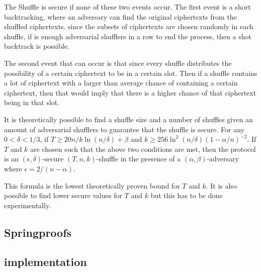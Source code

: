 The Shuffle is secure if none of these two events occur.
The first event is a short backtracking, where an adversary can find the original ciphertexts from the shuffled ciphertexts.
since the subsets of ciphertexts are chosen randomly in each shuffle, if is enough adversarial shufflers in a row to end the process, then a shot backtrack is possible.

The second event that can occur is that since every shuffle distributes the possibility of a certain ciphertext to be in a certain slot.
Then if a shuffle contains a lot of ciphertext with a larger than average chance of containing a certain ciphertext, then that would imply that there is a higher chance of that ciphertext being in that slot.

It is theoretically possible to find a shuffle size and a number of shuffles given an amount of adversarial shufflers to guarantee that the shuffle is secure.
For any $0 < \delta < 1/3$, if $T \geq 20 n / k \ln(n/\delta) + \beta $ and $ k \geq 256 \ln^2(n/\delta)(1 - \alpha/n)^{-2}$.
If $T$ and $k$ are chosen such that the above two conditions are met, then the protocol is an $(\epsilon , \delta)$-secure $(T,n,k)$-shuffle in the presence of a $(\alpha, \beta)$-adversary where $\epsilon = 2/(n-\alpha)$.

This formula is the lowest theoretically proven bound for $T$ and $k$.
It is also possible to find lower secure values for $T$ and $k$ but this has to be done experimentally.



\subsection{Springproofs}\label{sec:approach-springproofs}



\subsection{implementation}\label{sec:approach-implementation}


